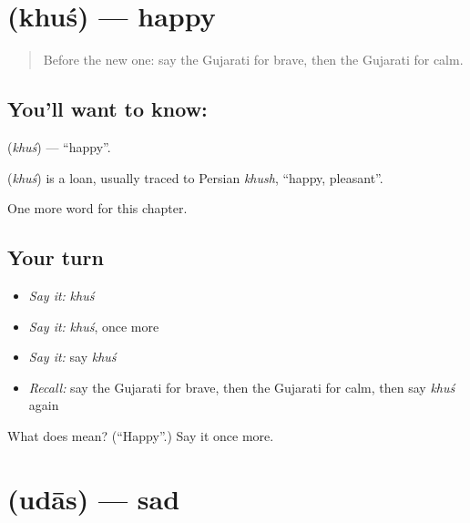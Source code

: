 \section[\texorpdfstring{\gu{ખુશ} (khuś)}{ખુશ (khuś)}]{ (khuś) — happy}

\label{lesson:GU-C134-khus}



\begin{quote}
Before the new one: say the Gujarati for brave, then the Gujarati for calm.
\end{quote}

\subsection*{You'll want to know: }
\textbf{} (\emph{khuś}) — \textquotedblleft{}happy\textquotedblright{}.

\begin{cousinweb}
\textbf{} (\emph{khuś}) is a loan, usually traced to Persian \emph{khush}, \textquotedblleft{}happy, pleasant\textquotedblright{}.
\end{cousinweb}

\begin{grammarlens}[title={What you've built}]
One more word for this chapter.
\end{grammarlens}

\subsection*{Your turn}
\begin{itemize}
\raggedright
  \item \emph{Say it:} \emph{khuś}
  \item \emph{Say it:} \emph{khuś}, once more
  \item \emph{Say it:} say \emph{khuś}
  \item \emph{Recall:} say the Gujarati for brave, then the Gujarati for calm, then say \emph{khuś} again
\end{itemize}

\begin{tcolorbox}[breakable,colback=teal!4,colframe=teal!35!black,title={Before you move on}]
What does  mean? (\textquotedblleft{}Happy\textquotedblright{}.) Say it once more.
\end{tcolorbox}
\section[\texorpdfstring{\gu{ઉદાસ} (udās)}{ઉદાસ (udās)}]{ (udās) — sad}

